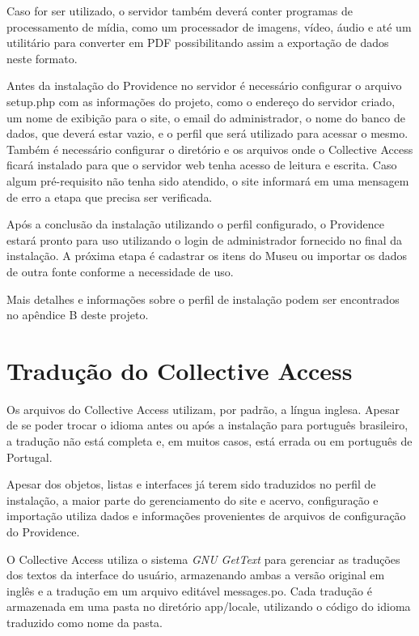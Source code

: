 \documentclass[a4paper,12pt,oneside,onecolumn,final,fleqn]{repUERJ}
\begin{document}
Caso for ser utilizado, o servidor também deverá conter programas de processamento de mídia, como um processador de imagens, vídeo, áudio e até um utilitário para converter em PDF possibilitando assim a exportação de dados neste formato.

Antes da instalação do Providence no servidor é necessário configurar o arquivo setup.php com as informações do projeto, como o endereço do servidor criado, um nome de exibição para o site, o email do administrador, o nome do banco de dados, que deverá estar vazio, e o perfil que será utilizado para acessar o mesmo. Também é necessário configurar o diretório e os arquivos onde o Collective Access ficará instalado para que o servidor web tenha acesso de leitura e escrita. Caso algum pré-requisito não tenha sido atendido, o site informará em uma mensagem de erro a etapa que precisa ser verificada.

Após a conclusão da instalação utilizando o perfil configurado, o Providence estará pronto para uso utilizando o login de administrador fornecido no final da instalação. A próxima etapa é cadastrar os itens do Museu ou importar os dados de outra fonte conforme a necessidade de uso.

Mais detalhes e informações sobre o perfil de instalação podem ser encontrados no apêndice B deste projeto.

\section{Tradução do Collective Access}

Os arquivos do Collective Access utilizam, por padrão, a língua inglesa. Apesar de se poder trocar o idioma antes ou após a instalação para português brasileiro, a tradução não está completa e, em muitos casos, está errada ou em português de Portugal.

Apesar dos objetos, listas e interfaces já terem sido traduzidos no perfil de instalação, a maior parte do gerenciamento do site e acervo, configuração e importação utiliza dados e informações provenientes de arquivos de configuração do Providence.

O Collective Access utiliza o sistema \textit{GNU GetText} para gerenciar as traduções dos textos da interface do usuário, armazenando ambas a versão original em inglês e a tradução em um arquivo editável messages.po. Cada tradução é armazenada em uma pasta no diretório app/locale, utilizando o código do idioma traduzido como nome da pasta.
\end{document}
